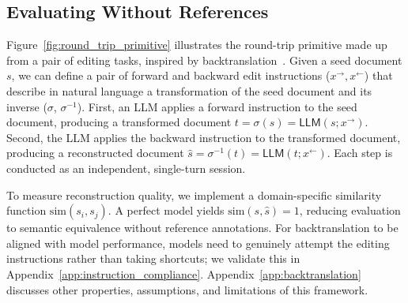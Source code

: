 \documentclass{article} %
\begin{document}
\subsection{Evaluating Without References} \label{sec:def_round_trip}

Figure~\ref{fig:round_trip_primitive} illustrates the round-trip primitive made up from a pair of editing tasks, inspired by backtranslation~\citep{Somers2005RoundtripTW}. Given a seed document $s$, we can define a pair of forward and backward edit instructions ($x^{\rightarrow}, x^{\leftarrow}$) that describe in natural language a transformation of the seed document and its inverse ($\sigma$, $\sigma^{-1}$). First, an LLM applies a forward instruction to the seed document, producing a transformed document $t=\sigma(s)=\textsf{LLM}(s; x^{\rightarrow})$. Second, the LLM applies the backward instruction to the transformed document, producing a reconstructed document $\hat{s}=\sigma^{-1}(t) = \textsf{LLM}(t; x^{\leftarrow})$. Each step is conducted as an independent, single-turn session.


To measure reconstruction quality, we implement a domain-specific similarity function $\mathrm{sim}(s_i, s_j)$. A perfect model yields $\mathrm{sim}(s, \hat{s}) = 1$, reducing evaluation to semantic equivalence without reference annotations. For backtranslation to be aligned with model performance, models need to genuinely attempt the editing instructions rather than taking shortcuts; we validate this in Appendix~\ref{app:instruction_compliance}. Appendix~\ref{app:backtranslation} discusses other properties, assumptions, and limitations of this framework.
\end{document}
